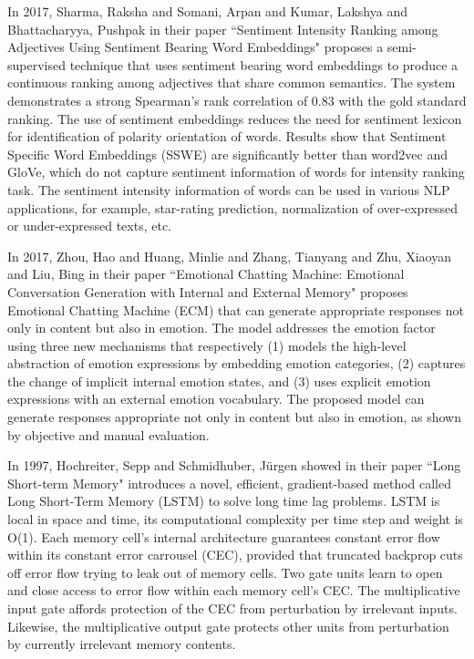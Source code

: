 In 2017, Sharma, Raksha and Somani, Arpan and Kumar, Lakshya and Bhattacharyya, Pushpak in their paper ``Sentiment Intensity Ranking among Adjectives Using Sentiment Bearing Word Embeddings" proposes a semi-supervised technique that uses sentiment bearing word embeddings to produce a continuous ranking among adjectives that share common semantics. The system demonstrates a strong Spearman's rank correlation of 0.83 with the gold standard ranking. The use of sentiment embeddings reduces the need for sentiment lexicon for identification of polarity orientation of words. Results show that Sentiment Specific Word Embeddings (SSWE) are significantly better than word2vec and GloVe, which do not capture sentiment information of words for intensity ranking task. The sentiment intensity information of words can be used in various NLP applications, for example, star-rating prediction, normalization of over-expressed or under-expressed texts, etc\cite{article7}.

In 2017, Zhou, Hao and Huang, Minlie and Zhang, Tianyang and Zhu, Xiaoyan and Liu, Bing in their paper ``Emotional Chatting Machine: Emotional Conversation Generation with Internal and External Memory" proposes Emotional Chatting Machine (ECM) that can generate appropriate responses not only in content but also in emotion. The model addresses the emotion factor using three new mechanisms that respectively (1) models the high-level abstraction of emotion expressions by embedding emotion categories, (2) captures the change of implicit internal emotion states, and (3) uses explicit emotion expressions with an external emotion vocabulary. The proposed model can generate responses appropriate not only in content but also in emotion, as shown by objective and manual evaluation\cite{article6}.

In 1997, Hochreiter, Sepp and Schmidhuber, Jürgen showed in their paper ``Long Short-term Memory" introduces a novel, efficient, gradient-based method called Long Short-Term Memory (LSTM) to solve long time lag problems. LSTM is local in space and time, its computational complexity per time step and weight is O(1). Each memory cell's internal architecture guarantees constant error flow within its constant error carrousel (CEC), provided that truncated backprop cuts off error flow trying to leak out of memory cells. Two gate units learn to open and close access to error flow within each memory cell's CEC. The multiplicative input gate affords protection of the CEC from perturbation by irrelevant inputs. Likewise, the multiplicative output gate protects other units from perturbation by currently irrelevant memory contents\cite{article}.